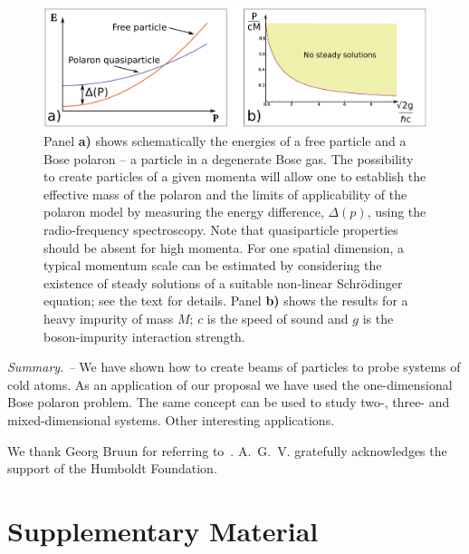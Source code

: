 \documentclass[twocolumn,amsmath,amssymb,showpacs,prl,superscriptaddress,aps]{revtex4-1}
\begin{document}
\begin{figure}
\centerline{\includegraphics[scale=0.3]{figure3.pdf}}
\caption{Panel {\bf a)} shows schematically the energies of a free particle and a Bose polaron --
a particle in a degenerate Bose gas. The possibility to create particles of a given momenta 
will allow one to establish the effective mass of the polaron
and the limits of applicability of the polaron model by measuring the energy difference, $\Delta(p)$, using the radio-frequency spectroscopy.
Note that quasiparticle properties should be absent for high momenta. For one spatial dimension, a typical momentum scale can be estimated  by considering the existence of steady solutions 
of a suitable non-linear Schr{\"o}dinger equation; see the text for details. Panel {\bf b)} 
shows the results for a heavy impurity of mass $M$; $c$ is the speed of sound
and $g$ is the boson-impurity interaction strength.
  }
\label{fig:Figure3}
\end{figure}



{\it Summary. --}  We have shown how to create beams of particles to probe systems of cold atoms. 
As an application of our proposal we have used the one-dimensional Bose polaron problem. The same concept
can be used to study two-, three- and mixed-dimensional systems. Other interesting applications. 







\begin{acknowledgments}
We thank Georg Bruun for referring to~\cite{zaccanti2017}.
A.~G.~V. gratefully acknowledges the support of the Humboldt Foundation.
\end{acknowledgments}

\widetext

\section{Supplementary Material}
\end{document}
